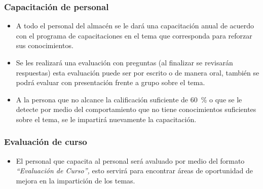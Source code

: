 \subsubsection{Capacitación de personal}
\begin{itemize}
	\item A todo el personal del almacén se le dará una capacitación anual de acuerdo con el programa de capacitaciones en el tema que corresponda para reforzar sus conocimientos.
	\item Se les realizará una evaluación con preguntas (al finalizar se revisarán respuestas) esta evaluación puede ser por escrito o de manera oral, también se podrá evaluar con presentación frente a grupo sobre el tema.
	\item A la persona que no alcance la calificación suficiente de \qty{60}{\percent} o que se le detecte por medio del comportamiento que no tiene conocimientos suficientes sobre el tema, se le impartirá nuevamente la capacitación.
\end{itemize}

\subsubsection{Evaluación de curso}
\begin{itemize}
	\item El personal que capacita al personal será avaluado por medio del formato \emph{“Evaluación de Curso”,} esto servirá para encontrar áreas de oportunidad de mejora en la impartición de los temas.
\end{itemize}

